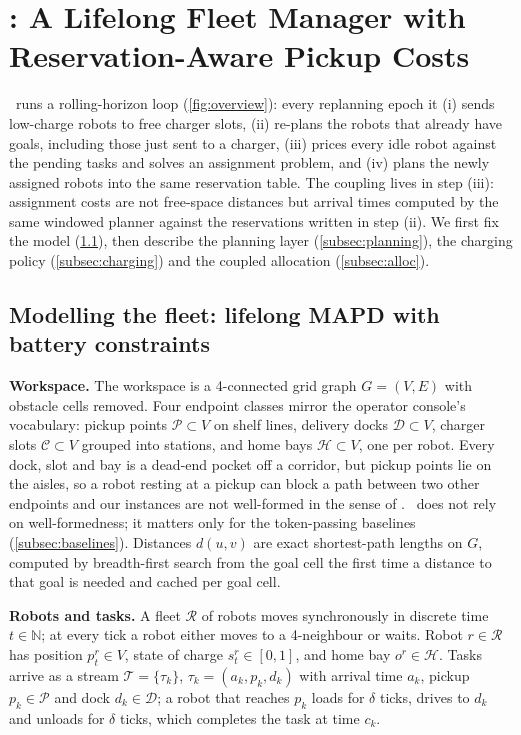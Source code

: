 \section{\sname: A Lifelong Fleet Manager with Reservation-Aware Pickup Costs}\label{sec:method}

\sname\ runs a rolling-horizon loop (\cref{fig:overview}): every replanning
epoch it (i) sends low-charge robots to free charger slots, (ii) re-plans the
robots that already have goals, including those just sent to a charger,
(iii) prices every idle robot against
the pending tasks and solves an assignment problem, and (iv) plans the newly
assigned robots into the same reservation table. The coupling lives in step
(iii): assignment costs are not free-space distances but arrival times
computed by the same windowed planner against the reservations written in
step (ii). We first fix the model (\cref{subsec:model}), then describe the
planning layer (\cref{subsec:planning}), the charging policy
(\cref{subsec:charging}) and the coupled allocation (\cref{subsec:alloc}).

\subsection{Modelling the fleet: lifelong MAPD with battery constraints}\label{subsec:model}

\noindent\textbf{Workspace.}
The workspace is a 4-connected grid graph $G=(V,E)$ with obstacle cells
removed. Four endpoint classes mirror the operator console's vocabulary:
pickup points $\mathcal{P}\subset V$ on shelf lines, delivery docks
$\mathcal{D}\subset V$, charger slots $\mathcal{C}\subset V$ grouped into
stations, and home bays $\mathcal{H}\subset V$, one per robot. Every dock,
slot and bay is a dead-end pocket off a corridor, but pickup points lie on
the aisles, so a robot resting at a pickup can block a path between two
other endpoints and our instances are not well-formed in the sense of
\citet{ma2017lifelong}. \sname\ does not rely on well-formedness; it matters
only for the token-passing baselines (\cref{subsec:baselines}).
Distances $d(u,v)$ are exact shortest-path lengths on $G$, computed by
breadth-first search from the goal cell the first time a distance to that goal
is needed and cached per goal cell.

\noindent\textbf{Robots and tasks.}
A fleet $\mathcal{R}$ of robots moves synchronously in discrete
time $t\in\mathbb{N}$; at every tick a robot either moves to a 4-neighbour or
waits. Robot $r\in\mathcal{R}$ has position $p_t^r\in V$, state of charge
$s_t^r\in[0,1]$, and home bay $o^r\in\mathcal{H}$. Tasks arrive as a stream
$\mathcal{T}=\{\tau_k\}$, $\tau_k=(a_k, p_k, d_k)$ with arrival time $a_k$,
pickup $p_k\in\mathcal{P}$ and dock $d_k\in\mathcal{D}$; a robot that reaches
$p_k$ loads for $\delta$ ticks, drives to $d_k$ and unloads for $\delta$
ticks, which completes the task at time $c_k$.

